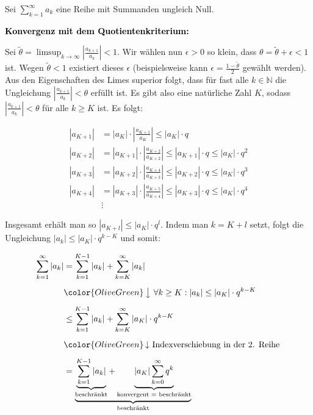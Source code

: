 \documentclass[fontsize=9pt,
               parskip=half-,
               DIV=14,
               listof=chapterentry,
               tocflat]{scrbook}
\newenvironment{indentblock}{\begin{adjustwidth}{.5cm}{}}{\end{adjustwidth}}
\newcommand{\proofstep}[1]{\textbf{\textcolor{Black}{#1}}}
\begin{document}
\begin{proof*}
Sei $\sum _{k=1}^{\infty }a_{k}$ eine Reihe mit Summanden ungleich Null.

\proofstep{Konvergenz mit dem Quotientenkriterium:}
 \begin{indentblock}
Sei ${\tilde {\theta }}=\limsup _{k\to \infty }\left|{\tfrac {a_{k+1}}{a_{k}}}\right|<1$. Wir wählen nun $\epsilon >0$ so klein, dass $\theta ={\tilde {\theta }}+\epsilon <1$ ist. Wegen ${\tilde {\theta }}<1$ existiert dieses $\epsilon $ (beispielsweise kann $\epsilon ={\tfrac {1-{\tilde {\theta }}}{2}}$ gewählt werden). Aus den Eigenschaften des Limes superior folgt, dass für fast alle $k\in \mathbb {N} $ die Ungleichung $\left|{\tfrac {a_{k+1}}{a_{k}}}\right|<\theta $ erfüllt ist. Es gibt also eine natürliche Zahl $K$, sodass $\left|{\tfrac {a_{k+1}}{a_{k}}}\right|<\theta $ für alle $k\geq K$ ist. Es folgt:

\begin{align*}
|a_{K+1}|&=|a_{K}|\cdot \left|{\frac {a_{K+1}}{a_{K}}}\right|\leq |a_{K}|\cdot q\\[0.5em]|a_{K+2}|&=|a_{K+1}|\cdot \left|{\frac {a_{K+2}}{a_{K+2}}}\right|\leq |a_{K+1}|\cdot q\leq |a_{K}|\cdot q^{2}\\[0.5em]|a_{K+3}|&=|a_{K+2}|\cdot \left|{\frac {a_{K+4}}{a_{K+3}}}\right|\leq |a_{K+2}|\cdot q\leq |a_{K}|\cdot q^{3}\\[0.5em]|a_{K+4}|&=|a_{K+3}|\cdot \left|{\frac {a_{K+5}}{a_{K+4}}}\right|\leq |a_{K+3}|\cdot q\leq |a_{K}|\cdot q^{4}\\[0.5em]&\vdots 
\end{align*}

Insgesamt erhält man so $|a_{K+l}|\leq |a_{K}|\cdot q^{l}$. Indem man $k=K+l$ setzt, folgt die Ungleichung $|a_{k}|\leq |a_{K}|\cdot q^{k-K}$ und somit:

\begin{align*}
\sum _{k=1}^{\infty }|a_{k}|&=\sum _{k=1}^{K-1}|a_{k}|+\sum _{k=K}^{\infty }|a_{k}|\\[0.5em]&{\color {OliveGreen}\left\downarrow \ \forall k\geq K:|a_{k}|\leq |a_{K}|\cdot q^{k-K}\right.}\\[0.5em]&\leq \sum _{k=1}^{K-1}|a_{k}|+\sum _{k=K}^{\infty }|a_{K}|\cdot q^{k-K}\\[0.5em]&{\color {OliveGreen}\left\downarrow \ {\text{Indexverschiebung in der 2. Reihe}}\right.}\\[0.5em]&=\underbrace {\underbrace {\sum _{k=1}^{K-1}|a_{k}|} _{\text{beschränkt}}+\underbrace {|a_{K}|\sum _{k=0}^{\infty }q^{k}} _{\text{konvergent = beschränkt}}} _{\text{beschränkt}}\\[0.5em]
\end{align*}


\end{indentblock}
\end{proof*}
\end{document}
